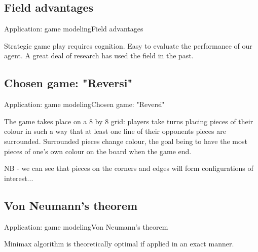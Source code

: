 \subsection{Field advantages}
\begin{frame}{Application: game modeling}{Field advantages}

Strategic game play requires cognition. Easy to evaluate the performance of our 
agent. A great deal of research has used  the field in the past.

\end{frame}

\subsection{Chosen game: "Reversi"}
\begin{frame}{Application: game modeling}{Chosen game: "Reversi"}

The game takes place on a 8 by 8 grid: players take turns placing pieces of their
colour in such a way that at least one line of their opponents pieces are
surrounded. Surrounded pieces change colour, the goal being to have the most 
pieces of one's own colour on the board when the game end.

NB - we can see that pieces on the corners and edges will form configurations of 
interest...

\end{frame}

\subsection{Von Neumann's theorem}
\begin{frame}{Application: game modeling}{Von Neumann's theorem}

Minimax algorithm is theoretically optimal if applied in an exact manner.

\end{frame}

